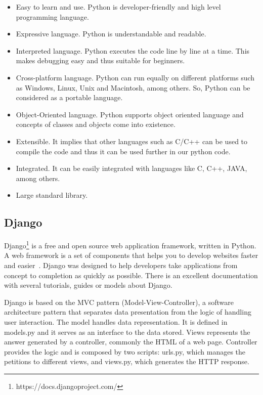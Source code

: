\begin{itemize}
  \item Easy to learn and use. Python is developer-friendly and high level programming language.
  
  \item Expressive language. Python is understandable and readable.
  
  \item Interpreted language. Python executes the code line by line at a time. This makes debugging easy and thus suitable for beginners.
  
  \item Cross-platform language. Python can run equally on different platforms such as Windows, Linux, Unix and Macintosh, among others. So, Python can be considered as a portable language.
  
  \item Object-Oriented language. Python supports object oriented language and concepts of classes and objects come into existence.
  
  \item Extensible. It implies that other languages such as C/C++ can be used to compile the code and thus it can be used further in our python code.
  
  \item Integrated. It can be easily integrated with languages like C, C++, JAVA, among others.
  
  \item Large standard library.
  
\end{itemize}



\subsection{Django}
\label{subsec:django}

Django\footnote{https://docs.djangoproject.com/} is a free and open source web application framework, written in Python. A web framework is a set of components that helps you to develop websites faster and easier~\cite{djangogirls}. Django was designed to help developers take applications from concept to completion as quickly as possible. There is an excellent documentation with several tutorials, guides or models about Django.

Django is based on the MVC pattern (Model-View-Controller), a software architecture pattern that separates data presentation from the logic of handling user interaction. The model handles data representation. It is defined in models.py and it serves as an interface to the data stored. Views represents the answer generated by a controller, commonly the HTML of a web page. Controller provides the logic and is composed by two scripts: urls.py, which manages the petitions to different views, and views.py, which generates the HTTP response. 

